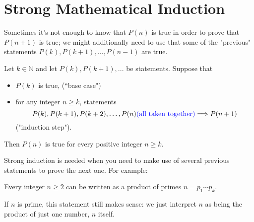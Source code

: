 \documentclass[11pt,dvipsnames]{book}
\numberwithin{equation}{section} %
\numberwithin{figure}{section} %
\numberwithin{table}{section} %
\begin{document}
\section{Strong Mathematical Induction}
Sometimes it's not enough to know that $P(n)$ is true in order to prove that $P(n+1)$ is true; we might additionally need to use that some of the "previous" statements $P(k), P(k+1), \dots , P(n-1)$ are true.  \\
%
%
%

\begin{definition}
  Let $k\in \mathbb{N}$ and let $P(k),P(k+1),...$ be statements. Suppose that\ 
  \begin{itemize}
  \item $P(k)$ is true,  (``base case")\ 
  \item for any integer
$n\geqslant k$, statements 
\[ P(k),P(k+1),P(k+2),\ldots,P(n)\mbox{{\color{blue} (all taken together)}}\Longrightarrow
P(n+1)\] 
("induction step"). 
\end{itemize} 
Then $P(n)$ is true for every positive integer $n\geqslant k$.
\end{definition}


\vspace{10pt}

Strong induction is needed when you need to make use of several previous statements to prove the next one. For example:

\begin{theorem}
Every integer $n\geq 2$ can be written as a product of primes $n=p_{1}\cdots p_{k}$. 
\end{theorem}


If $n$ is prime, this statement still makes sense: we just interpret $n$ as being the product of just one number, $n$ itself. 
\end{document}

